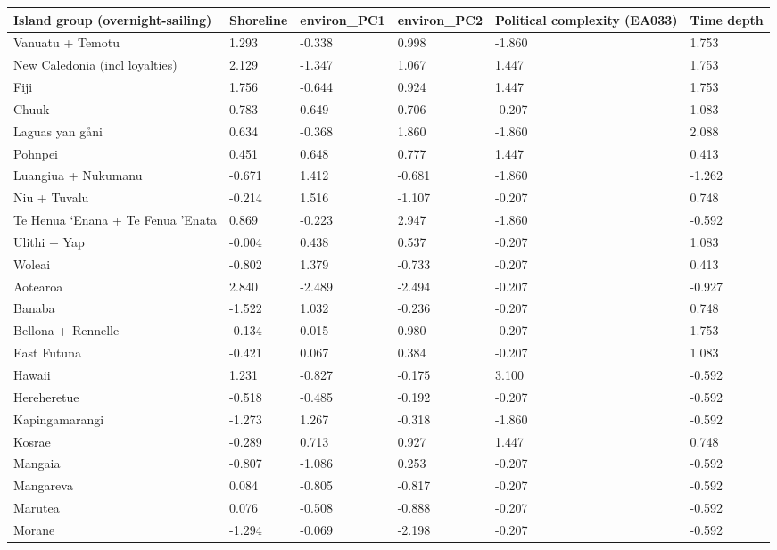\begin{longtable}{p{4.5cm}p{2cm}p{2cm}p{2cm}p{4cm}p{4cm}}
  \toprule
Island group (overnight-sailing) & Shoreline & environ_PC1 & environ_PC2 & Political complexity (EA033) & Time depth \\ 
  \midrule
Vanuatu + Temotu & 1.293 & -0.338 & 0.998 & -1.860 & 1.753 \\ 
  New Caledonia (incl loyalties) & 2.129 & -1.347 & 1.067 & 1.447 & 1.753 \\ 
  Fiji & 1.756 & -0.644 & 0.924 & 1.447 & 1.753 \\ 
  Chuuk & 0.783 & 0.649 & 0.706 & -0.207 & 1.083 \\ 
  Laguas yan gåni & 0.634 & -0.368 & 1.860 & -1.860 & 2.088 \\ 
  Pohnpei & 0.451 & 0.648 & 0.777 & 1.447 & 0.413 \\ 
  Luangiua + Nukumanu & -0.671 & 1.412 & -0.681 & -1.860 & -1.262 \\ 
  Niu + Tuvalu & -0.214 & 1.516 & -1.107 & -0.207 & 0.748 \\ 
  Te Henua ‘Enana + Te Fenua ’Enata & 0.869 & -0.223 & 2.947 & -1.860 & -0.592 \\ 
  Ulithi + Yap & -0.004 & 0.438 & 0.537 & -0.207 & 1.083 \\ 
  Woleai & -0.802 & 1.379 & -0.733 & -0.207 & 0.413 \\ 
  Aotearoa & 2.840 & -2.489 & -2.494 & -0.207 & -0.927 \\ 
  Banaba & -1.522 & 1.032 & -0.236 & -0.207 & 0.748 \\ 
  Bellona + Rennelle & -0.134 & 0.015 & 0.980 & -0.207 & 1.753 \\ 
  East Futuna & -0.421 & 0.067 & 0.384 & -0.207 & 1.083 \\ 
  Hawaii & 1.231 & -0.827 & -0.175 & 3.100 & -0.592 \\ 
  Hereheretue & -0.518 & -0.485 & -0.192 & -0.207 & -0.592 \\ 
  Kapingamarangi & -1.273 & 1.267 & -0.318 & -1.860 & -0.592 \\ 
  Kosrae & -0.289 & 0.713 & 0.927 & 1.447 & 0.748 \\ 
  Mangaia & -0.807 & -1.086 & 0.253 & -0.207 & -0.592 \\ 
  Mangareva & 0.084 & -0.805 & -0.817 & -0.207 & -0.592 \\ 
  Marutea & 0.076 & -0.508 & -0.888 & -0.207 & -0.592 \\ 
  Morane & -1.294 & -0.069 & -2.198 & -0.207 & -0.592 \\ 

\end{longtable}
